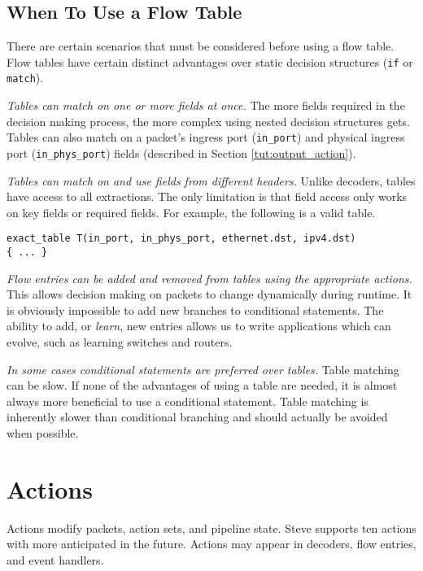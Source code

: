\subsection{When To Use a Flow Table} \label{tut:why_tables}

There are certain scenarios that must be considered before using a
flow table. Flow tables have certain distinct advantages over
static decision structures (\texttt{if} or \texttt{match}).

\textit{Tables can match on one or more fields at once.} The more fields
required in the decision making process, the more complex using nested decision
structures gets. Tables can also match on a packet's ingress port
(\texttt{in\_port}) and physical ingress port (\texttt{in\_phys\_port}) fields
(described in Section \ref{tut:output_action}).

\textit{Tables can match on and use fields from different headers.} Unlike
decoders, tables have access to all extractions. The only limitation is that
field access only works on key fields or required fields. For example, the
following is a valid table.

\begin{lstlisting}
exact_table T(in_port, in_phys_port, ethernet.dst, ipv4.dst)
{ ... }
\end{lstlisting}

\textit{Flow entries can be added and removed from tables using the appropriate
actions.} This allows decision making on packets to change dynamically during
runtime. It is obviously impossible to add new branches to conditional
statements. The ability to add, or \textit{learn}, new entries allows us to
write applications which can evolve, such as learning switches and routers.

\textit{In some cases conditional statements are preferred over tables.} 
Table matching can be slow. If none of the advantages of using a table are 
needed, it is almost always more beneficial to use a conditional statement. Table 
matching is inherently slower than conditional branching and should actually be 
avoided when possible.

\section{Actions} \label{tut:action}

Actions modify packets, action sets, and pipeline state. Steve supports ten
actions with more anticipated in the future. Actions may appear in decoders,
flow entries, and event handlers.

